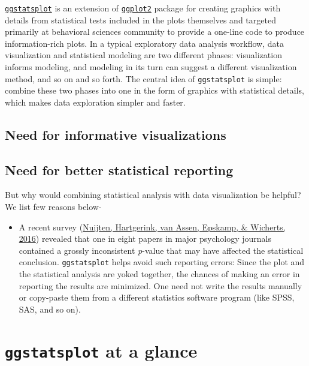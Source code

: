 \documentclass[
]{article}
\providecommand{\tightlist}{%
  \setlength{\itemsep}{0pt}\setlength{\parskip}{0pt}}
\begin{document}
\href{https://indrajeetpatil.github.io/ggstatsplot/}{\texttt{ggstatsplot}} is an extension
of \href{https://github.com/tidyverse/ggplot2}{\texttt{ggplot2}} package for creating
graphics with details from statistical tests included in the plots themselves
and targeted primarily at behavioral sciences community to provide a one-line
code to produce information-rich plots. In a typical exploratory data analysis
workflow, data visualization and statistical modeling are two different phases:
visualization informs modeling, and modeling in its turn can suggest a
different visualization method, and so on and so forth. The central idea of
\texttt{ggstatsplot} is simple: combine these two phases into one in the form of
graphics with statistical details, which makes data exploration simpler and
faster.

\hypertarget{need-for-informative-visualizations}{%
\subsection{Need for informative visualizations}\label{need-for-informative-visualizations}}

\hypertarget{need-for-better-statistical-reporting}{%
\subsection{Need for better statistical reporting}\label{need-for-better-statistical-reporting}}

But why would combining statistical analysis with data visualization be helpful?
We list few reasons below-

\begin{itemize}
\tightlist
\item
  A recent survey (\protect\hyperlink{ref-nuijtenPrevalenceStatisticalReporting2016}{Nuijten, Hartgerink, van Assen, Epskamp, \& Wicherts, 2016}) revealed that
  one in eight papers in major psychology journals contained a grossly
  inconsistent \emph{p}-value that may have affected the statistical conclusion.
  \texttt{ggstatsplot} helps avoid such reporting errors: Since the plot and the
  statistical analysis are yoked together, the chances of making an error in
  reporting the results are minimized. One need not write the results manually
  or copy-paste them from a different statistics software program (like SPSS,
  SAS, and so on).
\end{itemize}

\hypertarget{ggstatsplot-at-a-glance}{%
\section{\texorpdfstring{\texttt{ggstatsplot} at a glance}{ggstatsplot at a glance}}\label{ggstatsplot-at-a-glance}}
\end{document}
